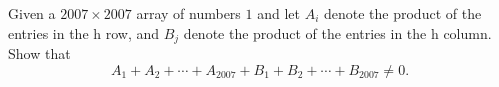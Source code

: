 Given a $2007\times 2007$ array of numbers $1$ and  let $A_{i}$ denote the product of the entries in the h row, and $B_{j}$ denote the product of the entries in the h column. Show that
\[A_{1}+A_{2}+\cdots +A_{2007}+B_{1}+B_{2}+\cdots +B_{2007}\neq 0.\]